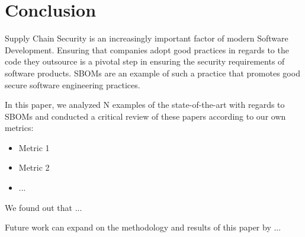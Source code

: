 \section{Conclusion}

Supply Chain Security is an increasingly important factor of modern Software Development. Ensuring that companies adopt good practices in regards to the code they outsource is a pivotal step in ensuring the security requirements of software products. SBOMs \needsRef are an example of such a practice that promotes good secure software engineering practices.

In this paper, we analyzed N examples of the state-of-the-art with regards to SBOMs and conducted a critical review of these papers according to our own metrics:
\begin{itemize}
    \item Metric 1
    \item Metric 2
    \item ...
\end{itemize}

We found out that ...

Future work can expand on the methodology and results of this paper by ...